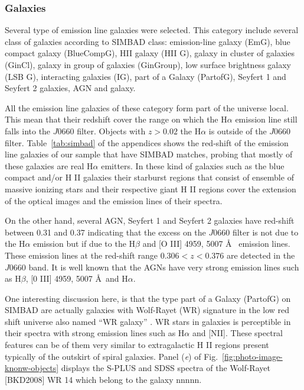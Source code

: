 \documentclass[fleqn,usenatbib]{mnras}
\begin{document}
\subsubsection{Galaxies}
Several type of emission line galaxies were selected. This category include
several class of galaxies according to SIMBAD class: emission-line galaxy (EmG),
blue compact galaxy (BlueCompG), HII galaxy (HII G), galaxy in cluster of galaxies
(GinCl), galaxy in group of galaxies (GinGroup), low surface brightness galaxy
(LSB G), interacting galaxies (IG), part of a Galaxy (PartofG), Seyfert 1 and
Seyfert 2 galaxies, AGN and galaxy.

All the emission line galaxies of these category form part of the universe local.
This mean that their redshift cover the range on which the H{$\alpha$} emission line still
falls into the $J0660$ filter. Objects with $ z >  0.02$ the  H{$\alpha$} is outside 
of the $J0660$ filter. Table~\ref{tab:simbad} of the appendices shows the red-shift of the
emission line galaxies of our sample that have SIMBAD matches, probing that mostly of 
these galaxies are real H{$\alpha$} emitters. In these kind of galaxies such as the blue 
compact and/or H II galaxies their starburst regions that consist of ensemble of massive 
ionizing stars and their respective giant H II regions cover the extension of the optical 
images and the emission lines of their spectra.

On the other hand, several AGN, Seyfert 1 and Seyfert 2 galaxies have red-shift 
between 0.31 and 0.37 indicating that the excess on the $J0660$ filter
is not due to the H{$\alpha$} emission but if due to the H{$\beta$} and [O III] 4959, 5007 \AA~ 
emission lines. These emission lines at the red-shift range $0.306 < z < 0.376$ are detected in the $J0660$ band. It is well known that the AGNs have very strong emission 
lines such as H{$\beta$}, [0 III] 4959, 5007 \AA~and H{$\alpha$}.

One interesting discussion here, is that the type part of a Galaxy (PartofG)
on SIMBAD are actually galaxies with Wolf-Rayet (WR) signature in the low red shift
universe also named ``WR galaxy'' \citep{Osterbrock:1982}. WR stars in galaxies
is perceptible in their spectra with strong emission lines such as H{$\alpha$}
and [NII]. These spectral features can be of them very similar to extragalactic
H II regions present typically of the outskirt of spiral galaxies. Panel (\textit{e}) 
of Fig.~\ref{fig:photo-image-knonw-objects} displays
the S-PLUS and SDSS spectra of the  Wolf-Rayet [BKD2008] WR 14 which belong 
to the galaxy nnnnn.
\end{document}
